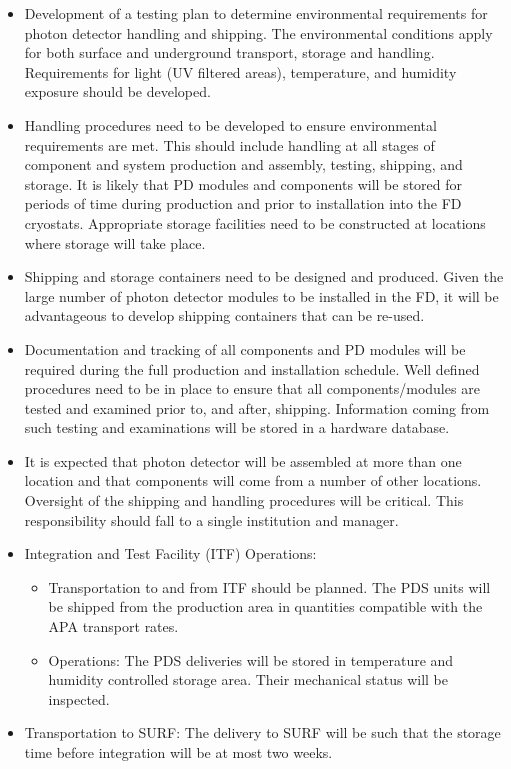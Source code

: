 \begin{itemize}

\item Development of a testing plan to determine environmental requirements for photon detector handling and shipping. The environmental conditions apply for both surface and underground transport, storage and handling. Requirements for light (UV filtered areas), temperature, and humidity exposure should be developed.

\item Handling procedures need to be developed to ensure environmental requirements are met. This should include handling at all stages of component and system production and assembly, testing, shipping, and storage. It is likely that PD modules and components will be stored for periods of time during production and prior to installation into the FD cryostats. Appropriate storage facilities need to be constructed at locations where storage will take place.
\item Shipping and storage containers need to be designed and produced. Given the large number of photon detector modules to be installed in the FD, it will be advantageous to develop shipping containers that can be re-used.

\item Documentation and tracking of all components and PD modules will be required during the full production and installation schedule. Well defined procedures need to be in place to ensure that all components/modules are tested and examined prior to, and after, shipping. Information coming from such testing and examinations will be stored in a hardware database.

\item It is expected that photon detector will be assembled at more than one location and that components will come from a number of other locations. Oversight of the shipping and handling procedures will be critical. This responsibility should fall to a single institution and manager.

\item Integration and Test Facility (ITF) Operations:

	\begin{itemize}
	\item Transportation to and from ITF should be planned. The PDS units will be shipped from the production area in 	
	quantities compatible with the APA transport rates.   
	\item Operations: The PDS deliveries will be stored in temperature and humidity controlled storage area. Their mechanical 
	status will be inspected.
	\end{itemize}

\item Transportation to SURF: The delivery to SURF will be such that the storage time before integration will be at most two weeks.

\end{itemize}

